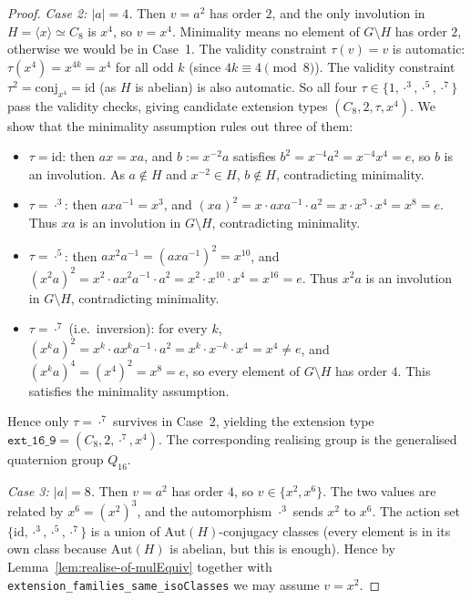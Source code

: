 \begin{proof}
  \smallskip
  \noindent
  \emph{Case 2: $|a| = 4$.} Then $v = a^2$ has order $2$, and the only
  involution in $H = \langle x \rangle \simeq C_8$ is $x^4$, so $v = x^4$.
  Minimality means no element of $G \setminus H$ has order $2$, otherwise we
  would be in Case~1. The validity constraint $\tau(v) = v$ is automatic:
  $\tau(x^4) = x^{4k} = x^4$ for all odd $k$ (since $4k \equiv 4 \pmod 8$).
  The validity constraint $\tau^2 = \mathrm{conj}_{x^4} = \mathrm{id}$ (as
  $H$ is abelian) is also automatic. So all four
  $\tau \in \{1, \cdot^3, \cdot^5, \cdot^7\}$ pass the validity checks, giving
  candidate extension types $(C_8, 2, \tau, x^4)$. We show that the minimality
  assumption rules out three of them:
  \begin{itemize}
    \item $\tau = \mathrm{id}$: then $a x = x a$, and $b := x^{-2} a$
    satisfies $b^2 = x^{-4} a^2 = x^{-4} x^4 = e$, so $b$ is an involution. As
    $a \notin H$ and $x^{-2} \in H$, $b \notin H$, contradicting minimality.
    \item $\tau = \cdot^3$: then $a x a^{-1} = x^3$, and $(xa)^2 = x \cdot
    a x a^{-1} \cdot a^2 = x \cdot x^3 \cdot x^4 = x^8 = e$. Thus $xa$ is an
    involution in $G \setminus H$, contradicting minimality.
    \item $\tau = \cdot^5$: then $a x^2 a^{-1} = (a x a^{-1})^2 = x^{10}$, and
    $(x^2 a)^2 = x^2 \cdot a x^2 a^{-1} \cdot a^2 = x^2 \cdot x^{10} \cdot x^4
    = x^{16} = e$. Thus $x^2 a$ is an involution in $G \setminus H$,
    contradicting minimality.
    \item $\tau = \cdot^7$ (i.e.\ inversion): for every $k$,
    $(x^k a)^2 = x^k \cdot a x^k a^{-1} \cdot a^2 = x^k \cdot x^{-k} \cdot x^4
    = x^4 \neq e$, and $(x^k a)^4 = (x^4)^2 = x^8 = e$, so every element of
    $G \setminus H$ has order $4$. This satisfies the minimality assumption.
  \end{itemize}
  Hence only $\tau = \cdot^7$ survives in Case~2, yielding the extension type
  $\mathtt{ext\_16\_9} = (C_8, 2, \cdot^7, x^4)$. The corresponding realising
  group is the generalised quaternion group $Q_{16}$.

  \smallskip
  \noindent
  \emph{Case 3: $|a| = 8$.} Then $v = a^2$ has order $4$, so
  $v \in \{x^2, x^6\}$. The two values are related by $x^6 = (x^2)^3$, and
  the automorphism $\cdot^3$ sends $x^2$ to $x^6$. The action set
  $\{\mathrm{id}, \cdot^3, \cdot^5, \cdot^7\}$ is a union of
  $\mathrm{Aut}(H)$-conjugacy classes (every element is in its own class
  because $\mathrm{Aut}(H)$ is abelian, but this is enough). Hence by
  Lemma~\ref{lem:realise-of-mulEquiv} together with
  \texttt{extension\_families\_same\_isoClasses} we may assume $v = x^2$.


\end{proof}
